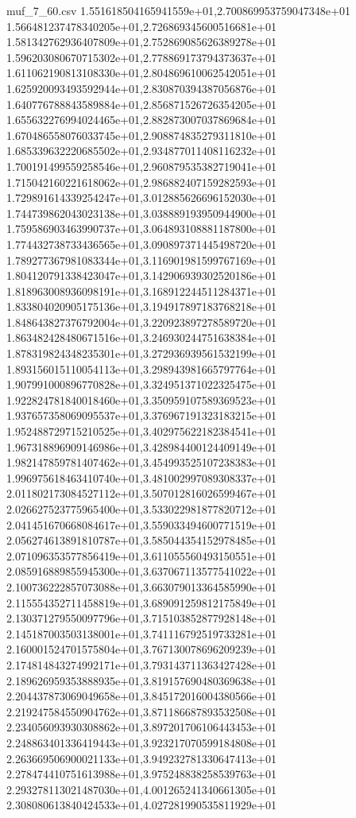 \begin{filecontents*}{muf_7_60.csv}
1.551618504165941559e+01,2.700869953759047348e+01
1.566481237478340205e+01,2.726869345600516681e+01
1.581342762936407809e+01,2.752869085626389278e+01
1.596203080670715302e+01,2.778869173794373637e+01
1.611062190813108330e+01,2.804869610062542051e+01
1.625920093493592944e+01,2.830870394387056876e+01
1.640776788843589884e+01,2.856871526726354205e+01
1.655632276994024465e+01,2.882873007037869684e+01
1.670486558076033745e+01,2.908874835279311810e+01
1.685339632220685502e+01,2.934877011408116232e+01
1.700191499559258546e+01,2.960879535382719041e+01
1.715042160221618062e+01,2.986882407159282593e+01
1.729891614339254247e+01,3.012885626696152030e+01
1.744739862043023138e+01,3.038889193950944900e+01
1.759586903463990737e+01,3.064893108881187800e+01
1.774432738733436565e+01,3.090897371445498720e+01
1.789277367981083344e+01,3.116901981599767169e+01
1.804120791338423047e+01,3.142906939302520186e+01
1.818963008936098191e+01,3.168912244511284371e+01
1.833804020905175136e+01,3.194917897183768218e+01
1.848643827376792004e+01,3.220923897278589720e+01
1.863482428480671516e+01,3.246930244751638384e+01
1.878319824348235301e+01,3.272936939561532199e+01
1.893156015110054113e+01,3.298943981665797764e+01
1.907991000896770828e+01,3.324951371022325475e+01
1.922824781840018460e+01,3.350959107589369523e+01
1.937657358069095537e+01,3.376967191323183215e+01
1.952488729715210525e+01,3.402975622182384541e+01
1.967318896909146986e+01,3.428984400124409149e+01
1.982147859781407462e+01,3.454993525107238383e+01
1.996975618463410740e+01,3.481002997089308337e+01
2.011802173084527112e+01,3.507012816026599467e+01
2.026627523775965400e+01,3.533022981877820712e+01
2.041451670668084617e+01,3.559033494600771519e+01
2.056274613891810787e+01,3.585044354152978485e+01
2.071096353577856419e+01,3.611055560493150551e+01
2.085916889855945300e+01,3.637067113577541022e+01
2.100736222857073088e+01,3.663079013364585990e+01
2.115554352711458819e+01,3.689091259812175849e+01
2.130371279550097796e+01,3.715103852877928148e+01
2.145187003503138001e+01,3.741116792519733281e+01
2.160001524701575804e+01,3.767130078696209239e+01
2.174814843274992171e+01,3.793143711363427428e+01
2.189626959353888935e+01,3.819157690480369638e+01
2.204437873069049658e+01,3.845172016004380566e+01
2.219247584550904762e+01,3.871186687893532508e+01
2.234056093930308862e+01,3.897201706106443453e+01
2.248863401336419443e+01,3.923217070599184808e+01
2.263669506900021133e+01,3.949232781330647413e+01
2.278474410751613988e+01,3.975248838258539763e+01
2.293278113021487030e+01,4.001265241340661305e+01
2.308080613840424533e+01,4.027281990535811929e+01

\end{filecontents*}

